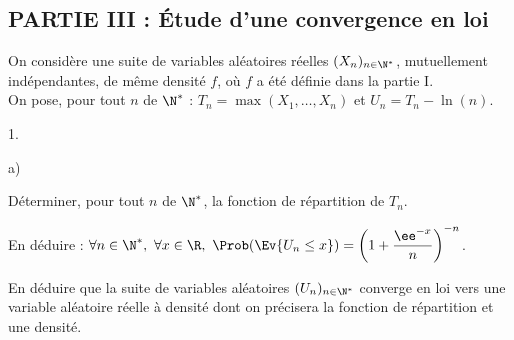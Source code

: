 \documentclass[11pt]{article}%
\begin{document}


\subsection*{PARTIE III : Étude d'une convergence en loi}

\noindent
On considère une suite de variables aléatoires réelles $(X_n)_{n\in
  \N^*}$, mutuellement indépendantes, de même densité $f$, où $f$ a
été définie dans la partie I.\\
On pose, pour tout $n$ de $\N^*$ : $T_n=\max(X_1,\ldots,X_n)$ et
$U_n=T_n-\ln(n)$.

\begin{noliste}{1.}
  \setlength{\itemsep}{2mm}
  \setcounter{enumi}{9}
\item
  \begin{noliste}{a)}
  \item Déterminer, pour tout $n$ de $\N^*$, la fonction de
    répartition de $T_n$.

    
    
  \item En déduire : $\forall n\in \N^*, \ \forall x\in \R, \
    \Prob(\Ev{U_n\leq x}) = \left(1 + \dfrac{\ee^{-x}}{n}
    \right)^{-n}$.
    
    
  \end{noliste}

\item En déduire que la suite de variables aléatoires
  $(U_n)_{n\in\N^*}$ converge en loi vers une variable aléatoire
  réelle à densité dont on précisera la fonction de répartition et une
  densité.



\end{noliste} 




% 
\end{document}
